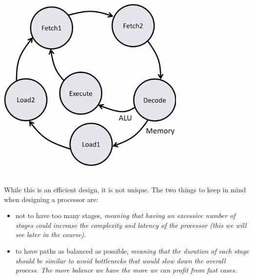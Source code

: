 \hfill
\vline
\hfill
\begin{minipage}[htp]{0.45\textwidth}
    \begin{center}
        \includegraphics[width=0.70\textwidth]{chapters/chapter2a/images/multi_cyc.png}
    \end{center}
\end{minipage} \\
\vspace*{5px}
While this is an efficient design, it is not unique. The two things to keep in mind when designing a processor are: 
\begin{itemize} 
    \item[] not to have too many stages, \textit{meaning that having an excessive number of stages could increase the complexity and latency of the processor (this we will see later in the course).} 
    \item[] to have paths as balanced as possible, \textit{meaning that the duration of each stage should be similar to avoid bottlenecks that would slow down the overall process. The more balance we have the more we can profit from fast cases.} 
\end{itemize}
\newpage
